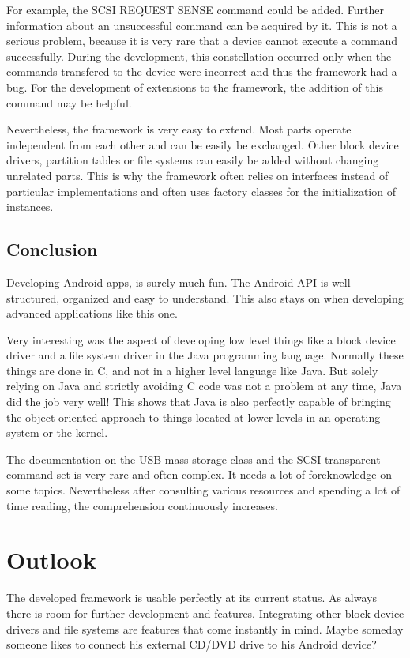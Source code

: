 For example, the SCSI REQUEST SENSE command could be added. Further information about an unsuccessful command can be acquired by it. This is not a serious problem, because it is very rare that a device cannot execute a command successfully. During the development, this constellation occurred only when the commands transfered to the device were incorrect and thus the framework had a bug. For the development of extensions to the framework, the addition of this command may be helpful.

Nevertheless, the framework is very easy to extend. Most parts operate independent from each other and can be easily be exchanged. Other block device drivers, partition tables or file systems can easily be added without changing unrelated parts. This is why the framework often relies on interfaces instead of particular implementations and often uses factory classes for the initialization of instances.

\section{Conclusion}

Developing Android apps, is surely much fun. The Android API is well structured, organized and easy to understand. This also stays on when developing advanced applications like this one. 

Very interesting was the aspect of developing low level things like a block device driver and a file system driver in the Java programming language. Normally these things are done in C, and not in a higher level language like Java. But solely relying on Java and strictly avoiding C code was not a problem at any time, Java did the job very well! This shows that Java is also perfectly capable of bringing the object oriented approach to things located at lower levels in an operating system or the kernel.

The documentation on the USB mass storage class and the SCSI transparent command set is very rare and often complex. It needs a lot of foreknowledge on some topics. Nevertheless after consulting various resources and spending a lot of time reading, the comprehension continuously increases.

\chapter{Outlook}

The developed framework is usable perfectly at its current status. As always there is room for further development and features. Integrating other block device drivers and file systems are features that come instantly in mind. Maybe someday someone likes to connect his external CD/DVD drive to his Android device?

